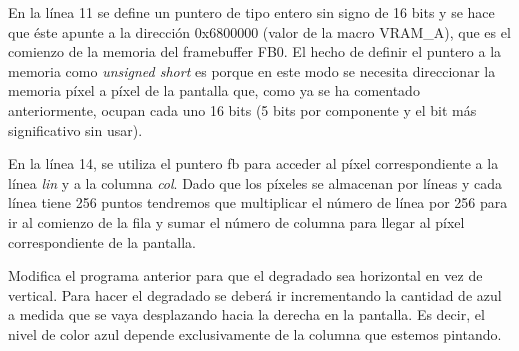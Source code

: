 En la línea 11 se define un puntero de tipo entero sin signo de 16 bits y se hace que éste apunte a la dirección 0x6800000 (valor de la macro VRAM\_A), que es el comienzo de la memoria del framebuffer FB0. El hecho de definir el puntero a la memoria como \textit{unsigned short} es porque en este modo se necesita direccionar la memoria píxel a píxel de la pantalla que, como ya se ha comentado anteriormente, ocupan cada uno 16 bits (5 bits por componente y el bit más significativo sin usar).

En la línea 14, se utiliza el puntero fb para acceder al píxel correspondiente a la línea \textit{lin} y a la columna \textit{col}. Dado que los píxeles se almacenan por líneas y cada línea tiene 256 puntos tendremos que multiplicar el número de línea por 256 para ir al comienzo de la fila y sumar el número de columna para llegar al píxel correspondiente de la pantalla. 


\begin{exercise}
Modifica el programa anterior para que el degradado sea horizontal en vez de vertical. Para hacer el degradado se deberá ir incrementando la cantidad de azul a medida que se vaya desplazando hacia la derecha en la pantalla. Es decir, el nivel de color azul depende exclusivamente de la columna que estemos pintando.
\end{exercise}

